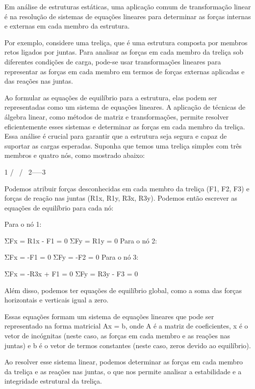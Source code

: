 Em análise de estruturas estáticas, uma aplicação comum de transformação linear é na resolução de sistemas de equações lineares para determinar as forças internas e externas em cada membro da estrutura.

Por exemplo, considere uma treliça, que é uma estrutura composta por membros retos ligados por juntas. Para analisar as forças em cada membro da treliça sob diferentes condições de carga, pode-se usar transformações lineares para representar as forças em cada membro em termos de forças externas aplicadas e das reações nas juntas.
 
Ao formular as equações de equilíbrio para a estrutura, elas podem ser representadas como um sistema de equações lineares. A aplicação de técnicas de álgebra linear, como métodos de matriz e transformações, permite resolver eficientemente esses sistemas e determinar as forças em cada membro da treliça. Essa análise é crucial para garantir que a estrutura seja segura e capaz de suportar as cargas esperadas.
	Suponha que temos uma treliça simples com três membros e quatro nós, como mostrado abaixo:

   1
  / \
 /   \
2-----3

Podemos atribuir forças desconhecidas em cada membro da treliça (F1, F2, F3) e forças de reação nas juntas (R1x, R1y, R3x, R3y). Podemos então escrever as equações de equilíbrio para cada nó:

Para o nó 1:

ΣFx = R1x - F1 = 0
ΣFy = R1y = 0
Para o nó 2:

ΣFx = -F1 = 0
ΣFy = -F2 = 0
Para o nó 3:

ΣFx = -R3x + F1 = 0
ΣFy = R3y - F3 = 0

Além disso, podemos ter equações de equilíbrio global, como a soma das forças horizontais e verticais igual a zero.

Essas equações formam um sistema de equações lineares que pode ser representado na forma matricial Ax = b, onde A é a matriz de coeficientes, x é o vetor de incógnitas (neste caso, as forças em cada membro e as reações nas juntas) e b é o vetor de termos constantes (neste caso, zeros devido ao equilíbrio).

	Ao resolver esse sistema linear, podemos determinar as forças em cada membro da treliça e as reações nas juntas, o que nos permite analisar a estabilidade e a integridade estrutural da treliça.






 
